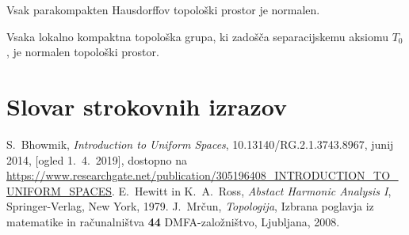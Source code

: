 \documentclass[mat1]{fmfdelo}
\begin{document}
\begin{trditev}\label{trd:parkompnorm} %
Vsak parakompakten Hausdorffov topološki prostor je normalen.
\end{trditev}

\begin{izrek}\label{izr:t4}
	Vsaka lokalno kompaktna topološka grupa, ki zadošča separacijskemu aksiomu $T_0$, je normalen topološki prostor.
\end{izrek}

\section*{Slovar strokovnih izrazov}

\geslo{}{}
\geslo{}{}

\begin{thebibliography}{99}

S.~Bhowmik, \emph{Introduction to Uniform Spaces}, 10.13140/RG.2.1.3743.8967, junij 2014, [ogled 1.~4.~2019], dostopno na \url{https://www.researchgate.net/publication/305196408_INTRODUCTION_TO_UNIFORM_SPACES}.
E.~Hewitt in K.~A.~Ross, \emph{Abstact Harmonic Analysis I}, Springer-Verlag, New York, 1979.
J.~Mrčun, \emph{Topologija}, Izbrana poglavja iz matematike in računalništva \textbf{44} DMFA-založništvo, Ljubljana, 2008.

\end{thebibliography}
\end{document}
